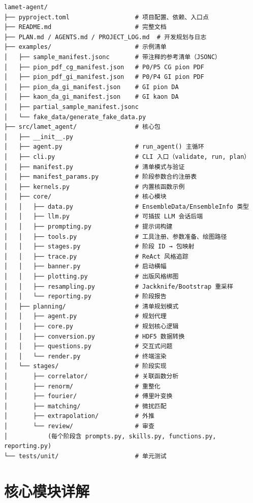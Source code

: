 \documentclass[12pt,a4paper]{ctexart}
\begin{document}
\begin{lstlisting}[style=bashcode]
lamet-agent/
├── pyproject.toml                  # 项目配置、依赖、入口点
├── README.md                       # 完整文档
├── PLAN.md / AGENTS.md / PROJECT_LOG.md  # 开发规划与日志
├── examples/                       # 示例清单
│   ├── sample_manifest.jsonc       # 带注释的参考清单（JSONC）
│   ├── pion_pdf_cg_manifest.json   # P0/P5 CG pion PDF
│   ├── pion_pdf_gi_manifest.json   # P0/P4 GI pion PDF
│   ├── pion_da_gi_manifest.json    # GI pion DA
│   ├── kaon_da_gi_manifest.json    # GI kaon DA
│   ├── partial_sample_manifest.jsonc
│   └── fake_data/generate_fake_data.py
├── src/lamet_agent/                # 核心包
│   ├── __init__.py
│   ├── agent.py                    # run_agent() 主循环
│   ├── cli.py                      # CLI 入口（validate, run, plan）
│   ├── manifest.py                 # 清单模式与验证
│   ├── manifest_params.py          # 阶段参数合约注册表
│   ├── kernels.py                  # 内置核函数示例
│   ├── core/                       # 核心模块
│   │   ├── data.py                 # EnsembleData/EnsembleInfo 类型
│   │   ├── llm.py                  # 可插拔 LLM 会话后端
│   │   ├── prompting.py            # 提示词构建
│   │   ├── tools.py                # 工具注册、参数准备、绘图路径
│   │   ├── stages.py               # 阶段 ID → 包映射
│   │   ├── trace.py                # ReAct 风格追踪
│   │   ├── banner.py               # 启动横幅
│   │   ├── plotting.py             # 出版风格绑图
│   │   ├── resampling.py           # Jackknife/Bootstrap 重采样
│   │   └── reporting.py            # 阶段报告
│   ├── planning/                   # 清单规划模式
│   │   ├── agent.py                # 规划代理
│   │   ├── core.py                 # 规划核心逻辑
│   │   ├── conversion.py           # HDF5 数据转换
│   │   ├── questions.py            # 交互式问题
│   │   └── render.py               # 终端渲染
│   └── stages/                     # 阶段实现
│       ├── correlator/             # 关联函数分析
│       ├── renorm/                 # 重整化
│       ├── fourier/                # 傅里叶变换
│       ├── matching/               # 微扰匹配
│       ├── extrapolation/          # 外推
│       └── review/                 # 审查
│           (每个阶段含 prompts.py, skills.py, functions.py, reporting.py)
└── tests/unit/                     # 单元测试
\end{lstlisting}

\section{核心模块详解}
\end{document}
